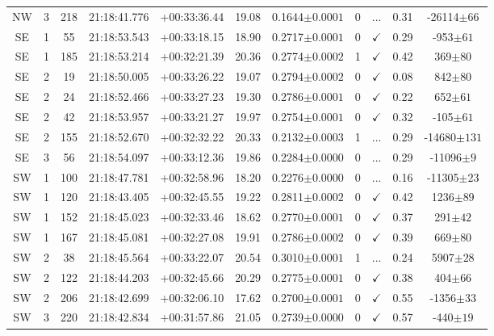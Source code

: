 \begin{table*}
\begin{tabular}{ccccccccccc}
NW & 3 & 218 & 21:18:41.776 & +00:33:36.44 & 19.08 & 0.1644$\pm{0.0001}$ & 0 & ... & 0.31 & -26114$\pm{66}$ \\
SE & 1 & 55 & 21:18:53.543 & +00:33:18.15 & 18.90 & 0.2717$\pm{0.0001}$ & 0 & $\checkmark$ & 0.29 & -953$\pm{61}$ \\
SE & 1 & 185 & 21:18:53.214 & +00:32:21.39 & 20.36 & 0.2774$\pm{0.0002}$ & 1 & $\checkmark$ & 0.42 & 369$\pm{80}$ \\
SE & 2 & 19 & 21:18:50.005 & +00:33:26.22 & 19.07 & 0.2794$\pm{0.0002}$ & 0 & $\checkmark$ & 0.08 & 842$\pm{80}$ \\
SE & 2 & 24 & 21:18:52.466 & +00:33:27.23 & 19.30 & 0.2786$\pm{0.0001}$ & 0 & $\checkmark$ & 0.22 & 652$\pm{61}$ \\
SE & 2 & 42 & 21:18:53.957 & +00:33:21.27 & 19.97 & 0.2754$\pm{0.0001}$ & 0 & $\checkmark$ & 0.32 & -105$\pm{61}$ \\
SE & 2 & 155 & 21:18:52.670 & +00:32:32.22 & 20.33 & 0.2132$\pm{0.0003}$ & 1 & ... & 0.29 & -14680$\pm{131}$ \\
SE & 3 & 56 & 21:18:54.097 & +00:33:12.36 & 19.86 & 0.2284$\pm{0.0000}$ & 0 & ... & 0.29 & -11096$\pm{9}$ \\
SW & 1 & 100 & 21:18:47.781 & +00:32:58.96 & 18.20 & 0.2276$\pm{0.0000}$ & 0 & ... & 0.16 & -11305$\pm{23}$ \\
SW & 1 & 120 & 21:18:43.405 & +00:32:45.55 & 19.22 & 0.2811$\pm{0.0002}$ & 0 & $\checkmark$ & 0.42 & 1236$\pm{89}$ \\
SW & 1 & 152 & 21:18:45.023 & +00:32:33.46 & 18.62 & 0.2770$\pm{0.0001}$ & 0 & $\checkmark$ & 0.37 & 291$\pm{42}$ \\
SW & 1 & 167 & 21:18:45.081 & +00:32:27.08 & 19.91 & 0.2786$\pm{0.0002}$ & 0 & $\checkmark$ & 0.39 & 669$\pm{80}$ \\
SW & 2 & 38 & 21:18:45.564 & +00:33:22.07 & 20.54 & 0.3010$\pm{0.0001}$ & 1 & ... & 0.24 & 5907$\pm{28}$ \\
SW & 2 & 122 & 21:18:44.203 & +00:32:45.66 & 20.29 & 0.2775$\pm{0.0001}$ & 0 & $\checkmark$ & 0.38 & 404$\pm{66}$ \\
SW & 2 & 206 & 21:18:42.699 & +00:32:06.10 & 17.62 & 0.2700$\pm{0.0001}$ & 0 & $\checkmark$ & 0.55 & -1356$\pm{33}$ \\
SW & 3 & 220 & 21:18:42.834 & +00:31:57.86 & 21.05 & 0.2739$\pm{0.0000}$ & 0 & $\checkmark$ & 0.57 & -440$\pm{19}$ \\
		\hline
	\end{tabular}
	\label{tbl:c319p70+0p56}
\end{table*}

